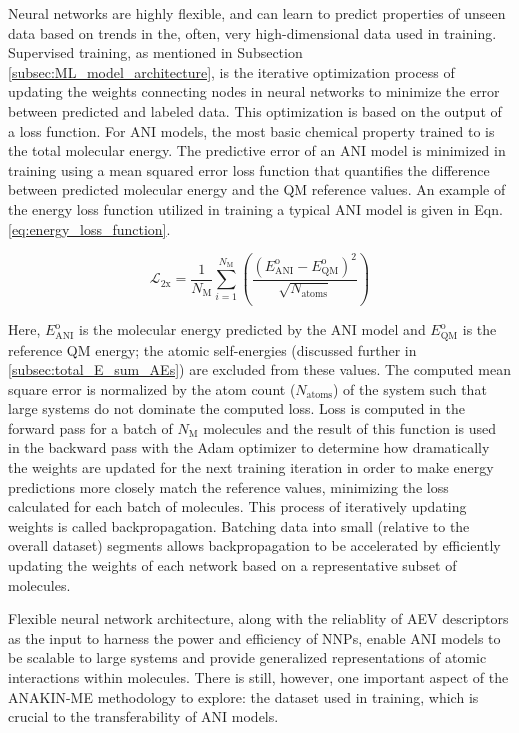 Neural networks are highly flexible, and can learn to predict properties of unseen data based on trends in the, often, very high-dimensional data used in training.
Supervised training, as mentioned in Subsection \ref{subsec:ML_model_architecture}, is the iterative optimization process of updating the weights connecting nodes in neural networks to minimize the error between predicted and labeled data.
This optimization is based on the output of a loss function.
For ANI models, the most basic chemical property trained to is the total molecular energy.
The predictive error of an ANI model is minimized in training using a mean squared error loss function that quantifies the difference between predicted molecular energy and the QM reference values.
An example of the energy loss function utilized in training a typical ANI model is given in Eqn. \ref{eq:energy_loss_function}.

\begin{equation}
    \mathcal{L}_{\text{2x}} =
    \frac{1}{N_{\text{M}}} 
    \sum_{i=1}^{N_{\text{M}}} 
    \left( \frac{ \left( E_{\text{ANI}}^\text{o} - E_{\text{QM}}^\text{o} \right)^2}
    {\sqrt{N_{\text{atoms}}}} \right)
    \label{eq:energy_loss_function}
\end{equation}

Here, $E_{\text{ANI}}^\text{o}$ is the molecular energy predicted by the ANI model and $E_{\text{QM}}^\text{o}$ is the reference QM energy; the atomic self-energies (discussed further in \ref{subsec:total_E_sum_AEs}) are excluded from these values.
The computed mean square error is normalized by the atom count ($N_{\text{atoms}}$) of the system such that large systems do not dominate the computed loss.
Loss is computed in the forward pass for a batch of $N_{\text{M}}$ molecules and the result of this function is used in the backward pass with the Adam optimizer \cite{adam_optim} to determine how dramatically the weights are updated for the next training iteration in order to make energy predictions more closely match the reference values, minimizing the loss calculated for each batch of molecules. 
This process of iteratively updating weights is called backpropagation.
Batching data into small (relative to the overall dataset) segments allows backpropagation to be accelerated by efficiently updating the weights of each network based on a representative subset of molecules. 

Flexible neural network architecture, along with the reliablity of AEV descriptors as the input to harness the power and efficiency of NNPs, enable ANI models to be scalable to large systems and provide generalized representations of atomic interactions within molecules.
There is still, however, one important aspect of the ANAKIN-ME methodology to explore: the dataset used in training, which is crucial to the transferability of ANI models.


